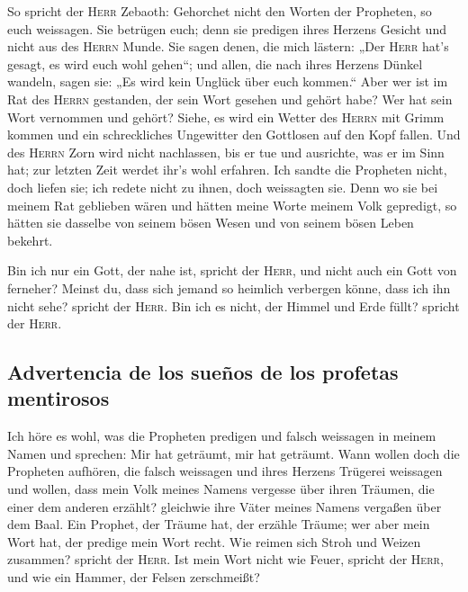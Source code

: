  So spricht der \textsc{Herr} Zebaoth: Gehorchet nicht
den Worten der Propheten, so euch weissagen. Sie betrügen euch; denn sie
predigen ihres Herzens Gesicht und nicht aus des \textsc{Herrn} Munde.
 Sie sagen denen, die mich lästern: „Der \textsc{Herr}
hat's gesagt, es wird euch wohl gehen``; und allen, die nach ihres
Herzens Dünkel wandeln, sagen sie: „Es wird kein Unglück über euch
kommen.``  Aber wer ist im Rat des \textsc{Herrn}
gestanden, der sein Wort gesehen und gehört habe? Wer hat sein Wort
vernommen und gehört?  Siehe, es wird ein Wetter des
\textsc{Herrn} mit Grimm kommen und ein schreckliches Ungewitter den
Gottlosen auf den Kopf fallen.  Und des \textsc{Herrn}
Zorn wird nicht nachlassen, bis er tue und ausrichte, was er im Sinn
hat; zur letzten Zeit werdet ihr's wohl erfahren.  Ich
sandte die Propheten nicht, doch liefen sie; ich redete nicht zu ihnen,
doch weissagten sie.  Denn wo sie bei meinem Rat
geblieben wären und hätten meine Worte meinem Volk gepredigt, so hätten
sie dasselbe von seinem bösen Wesen und von seinem bösen Leben bekehrt.

 Bin ich nur ein Gott, der nahe ist, spricht der
\textsc{Herr}, und nicht auch ein Gott von ferneher? 
Meinst du, dass sich jemand so heimlich verbergen könne, dass ich ihn
nicht sehe? spricht der \textsc{Herr}. Bin ich es nicht, der Himmel und
Erde füllt? spricht der \textsc{Herr}.

\hypertarget{advertencia-de-los-sueuxf1os-de-los-profetas-mentirosos}{%
\subsection{Advertencia de los sueños de los profetas
mentirosos}\label{advertencia-de-los-sueuxf1os-de-los-profetas-mentirosos}}

 Ich höre es wohl, was die Propheten predigen und falsch
weissagen in meinem Namen und sprechen: Mir hat geträumt, mir hat
geträumt.  Wann wollen doch die Propheten aufhören, die
falsch weissagen und ihres Herzens Trügerei weissagen 
und wollen, dass mein Volk meines Namens vergesse über ihren Träumen,
die einer dem anderen erzählt? gleichwie ihre Väter meines Namens
vergaßen über dem Baal.  Ein Prophet, der Träume hat, der
erzähle Träume; wer aber mein Wort hat, der predige mein Wort recht. Wie
reimen sich Stroh und Weizen zusammen? spricht der \textsc{Herr}.
 Ist mein Wort nicht wie Feuer, spricht der
\textsc{Herr}, und wie ein Hammer, der Felsen zerschmeißt?

